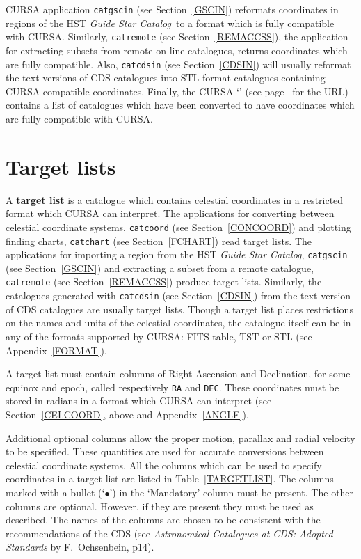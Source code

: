 \documentclass[twoside,11pt]{starlink}
\begin{document}
CURSA application \texttt{catgscin} (see Section~\ref{GSCIN}) reformats
coordinates in regions of the HST \textit{Guide Star Catalog}\, to a
format which is fully compatible with CURSA.  Similarly, \texttt{catremote}
(see Section~\ref{REMACCSS}), the application for extracting subsets
from remote on-line catalogues, returns coordinates which are fully
compatible.  Also, \texttt{catcdsin} (see Section~\ref{CDSIN}) will
usually reformat the text versions of CDS catalogues into STL format
catalogues containing CURSA-compatible coordinates.  Finally, the CURSA
`'
(see page~\pageref{HOMEPAGE} for the URL) contains a list of catalogues
which have been converted to have coordinates which are fully compatible
with CURSA.


\section{\label{TARGLIST}Target lists}

A \textbf{target list} is a catalogue which contains celestial coordinates
in a restricted format which CURSA can interpret.  The applications for
converting between celestial coordinate systems, \texttt{catcoord} (see
Section~\ref{CONCOORD}) and plotting finding charts, \texttt{catchart} (see
Section~\ref{FCHART}) read target lists.  The applications for
importing a region from the HST \textit{Guide Star Catalog}, \texttt{catgscin}
(see Section~\ref{GSCIN})
and extracting a subset from a remote catalogue, \texttt{catremote} (see
Section~\ref{REMACCSS}) produce target lists.  Similarly, the catalogues
generated with \texttt{catcdsin} (see Section~\ref{CDSIN}) from the text
version of CDS catalogues are usually target lists.  Though a target
list places restrictions on the names and units of the celestial
coordinates, the catalogue itself can be in any of the formats supported
by CURSA: FITS table, TST or STL (see Appendix~\ref{FORMAT}).

A target list must contain columns of Right Ascension and Declination,
for some equinox and epoch, called respectively \texttt{RA} and \texttt{DEC}.
These coordinates must be stored in radians in a format which CURSA can
interpret (see Section~\ref{CELCOORD}, above and Appendix~\ref{ANGLE}).

Additional optional columns allow the proper motion, parallax and radial
velocity to be specified.  These quantities are used for accurate
conversions between celestial coordinate systems.  All the columns which
can be used to specify coordinates in a target list are listed in
Table~\ref{TARGETLIST}.  The columns marked with a bullet (`$\bullet$')
in the `Mandatory' column must be present.  The other columns are
optional. However, if they are present they must be used as described.
The names of the columns are chosen to be consistent with the
recommendations of the CDS (see \textit{Astronomical Catalogues at CDS:
Adopted Standards} by F.~Ochsenbein\cite{CDSTAND}, p14).
\end{document}
